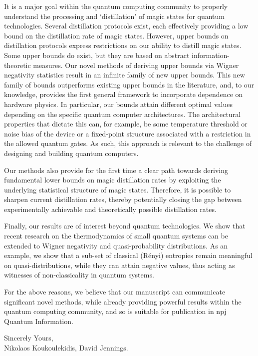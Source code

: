 \documentclass[11pt]{letter}
\begin{document}
It is a major goal within the quantum computing community to properly understand the processing and `distillation' of magic states for quantum technologies. Several distillation protocols exist, each effectively providing a low bound on the distillation rate of magic states. However, upper bounds on distillation protocols express restrictions on our ability to distill magic states. Some upper bounds do exist, but they are based on abstract information-theoretic measures. Our novel methods of deriving upper bounds via Wigner negativity statistics result in an infinite family of new upper bounds. This new family of bounds outperforms existing upper bounds in the literature, and, to our knowledge, provides the first general framework to incorporate dependence on hardware physics. In particular, our bounds attain different optimal values depending on the specific quantum computer architectures. The architectural properties that dictate this can, for example, be some temperature threshold or noise bias of the device or a fixed-point structure associated with a restriction in the allowed quantum gates.  As such, this approach is relevant to the challenge of designing and building quantum computers.

Our methods also provide for the first time a clear path towards deriving fundamental lower bounds on magic distillation rates by exploiting the underlying statistical structure of magic states. Therefore, it is possible to sharpen current distillation rates, thereby potentially closing the gap between experimentally achievable and theoretically possible distillation rates.

Finally, our results are of interest beyond quantum technologies. We show that recent research on the thermodynamics of small quantum systems can be extended to Wigner negativity and quasi-probability distributions. As an example, we show that a sub-set of classical (R\'{e}nyi) entropies remain meaningful on quasi-distributions, while they can attain negative values, thus acting as witnesses of non-classicality in quantum systems.

For the above reasons, we believe that our manuscript can communicate significant novel methods, while already providing powerful results within the quantum computing community, and so is suitable for publication in npj Quantum Information.

\vspace{1cm}
\hspace{8cm}
\begin{minipage}{9cm}
\flushleft
Sincerely Yours,\\

Nikolaos Koukoulekidis, David Jennings.
\end{minipage}
\end{document}
